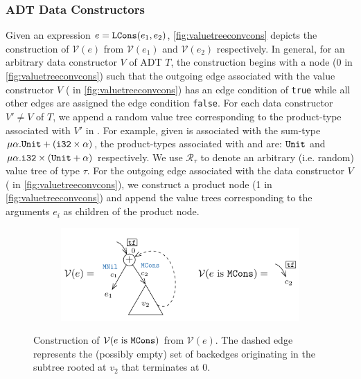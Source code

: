 \subsubsection{ADT Data Constructors}
Given an expression $e = {\tt LCons}(e_1, e_2)$,
\cref{fig:valuetreeconvcons} depicts the construction of $\mathcal{V}(e)$
from $\mathcal{V}(e_1)$ and $\mathcal{V}(e_2)$ respectively.
In general, for an arbitrary data constructor $V$ of ADT $T$,
the construction begins with a \sumn{} node (0 in \cref{fig:valuetreeconvcons})
such that the outgoing edge associated with the value constructor $V$ ( in \cref{fig:valuetreeconvcons})
has an edge condition of {\tt true} while all other edges are assigned the edge condition {\tt false}.
For each data constructor $V' \neq V$ of $T$, we append a random value tree corresponding to the product-type
associated with $V'$ in \typegrammar{}.
For example, given  is associated with the sum-type $\mu \alpha. {\tt Unit} + ({\tt i32} \times \alpha)$,
the product-types associated with  and  are:
${\tt Unit}$ and $\mu \alpha. {\tt i32} \times ({\tt Unit} + \alpha)$ respectively.
We use $\mathcal{R}_\tau$ to denote an arbitrary (i.e. random) value tree of type $\tau$.
For the outgoing edge associated with the data constructor $V$ ( in \cref{fig:valuetreeconvcons}),
we construct a product node (1 in \cref{fig:valuetreeconvcons}) and append the
value trees corresponding to the arguments $e_i$ as children of the product node.
\begin{figure}[t!]
\begin{subfigure}[b]{\textwidth}
\begin{center}
\includegraphics[scale=1.3]{chapters/figures/figValueTreeConvSumIs.pdf}
\end{center}
\end{subfigure}
\vspace{5px}
\caption{\label{fig:valuetreeconvsumis}Construction of $\mathcal{V}(e\ \mathrm{is}\ {\tt MCons})$ from $\mathcal{V}(e)$.
The dashed edge represents the (possibly empty) set of backedges originating in the subtree rooted at $v_2$ that terminates at 0.}
\end{figure}

